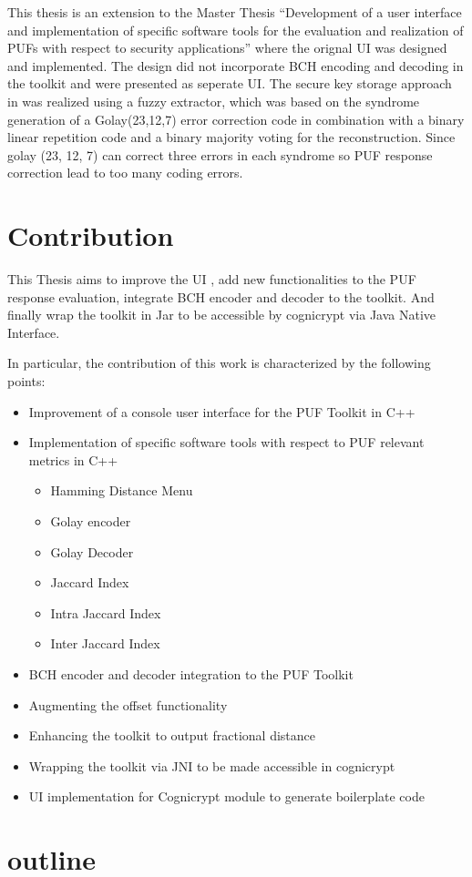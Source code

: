 This thesis is an extension to the Master Thesis ``Development of a user interface and implementation of specific software tools for the evaluation and realization of PUFs with respect to security applications''\cite{71} where the orignal UI was designed and implemented. The design did not incorporate BCH encoding and decoding in the toolkit and were presented as seperate UI. The secure key storage approach in \cite{10} was realized using a fuzzy extractor, which was based on the syndrome generation of a Golay(23,12,7) error correction code in combination with a binary linear repetition code and a binary majority voting for the reconstruction\cite{71}. Since golay (23, 12, 7) can correct three errors in each syndrome so PUF response correction lead to too many coding errors.

\section{Contribution}
This Thesis aims to improve the UI , add new functionalities to the PUF response evaluation, integrate BCH encoder and decoder to the toolkit.
And finally wrap the toolkit in Jar to be accessible by cognicrypt via Java Native Interface.

In particular, the contribution of this work is characterized by the following points:

\begin{itemize}
	\item Improvement of a console user interface for the PUF Toolkit in C++
	\item Implementation of specific software tools with respect to PUF relevant metrics in C++
		\begin{itemize}
			\item Hamming Distance Menu
			\item Golay encoder 
			\item Golay Decoder
			\item Jaccard Index 
			\item Intra Jaccard Index
			\item Inter Jaccard Index
		\end{itemize}
	\item BCH encoder and decoder integration to the PUF Toolkit
	\item Augmenting the offset functionality
	\item Enhancing the toolkit to output fractional distance
	\item Wrapping the toolkit via JNI to be made accessible in cognicrypt
	\item UI implementation for Cognicrypt module to generate boilerplate code
\end{itemize}

\section{outline} %
